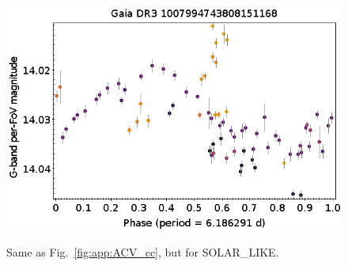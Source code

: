 \documentclass[longauth]{aa}
\begin{document}
\begin{appendix}
\begin{figure}
\hspace{2mm}
 \includegraphics[width=0.45\hsize]{figures/appendix/Rotational_Modulation-98.png} \\
\vspace{4mm}
 \caption{Same as Fig.~\ref{fig:app:ACV_cc}, but for SOLAR\_LIKE.}
 \label{fig:app:SOLAR_LIKE_cc}
\end{figure}




\end{appendix}
\end{document}
